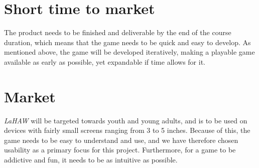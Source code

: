 	\section{Short time to market}
	The product needs to be finished and deliverable by the end of the course duration, which means that the game needs to be quick and easy to develop. As mentioned above, the game will be developed iteratively, making a playable game available as early as possible, yet expandable if time allows for it.

	\section{Market}
	\emph{LaHAW} will be targeted towards youth and young adults, and is to be used on devices with fairly small screens ranging from 3 to 5 inches. Because of this, the game needs to be easy to understand and use, and we have therefore chosen usability as a primary focus for this project. Furthermore, for a game to be addictive and fun, it needs to be as intuitive as possible.


